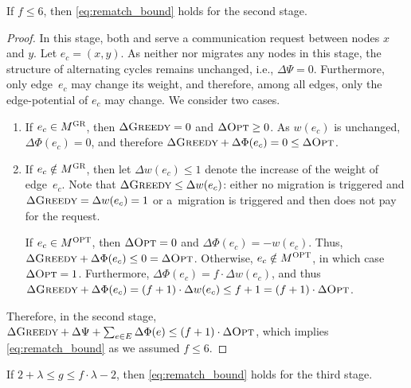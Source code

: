 \begin{lemma}
\label{lem:rematch_req}
If $f \leq 6$, then \eqref{eq:rematch_bound} holds for the second stage.
\end{lemma}

\begin{proof}
In this stage, both \GREEDY and \OPT serve a communication request between
nodes $x$ and $y$. Let $e_c = (x,y)$. As neither \GREEDY nor \OPT migrates any
nodes in this stage, the structure of alternating cycles remains
unchanged, i.e., $\Delta \Psi = 0$. Furthermore, only edge~$e_c$ may change its
weight, and therefore, among all edges, only the edge-potential of $e_c$ may
change. We consider two cases.
\begin{enumerate}

\item If $e_c \in M^\textsc{GR}$, then $\Delta \textsc{Greedy} = 0$ and $\Delta \textsc{Opt} \geq 0$. As
$w(e_c)$ is unchanged, $\Delta \Phi(e_c) = 0$, and therefore 
$\Delta \textsc{Greedy} + \Delta \Phi(e_c) = 0 \leq \Delta \textsc{Opt}$. 

\item If $e_c \notin M^\textsc{GR}$, then let $\Delta w(e_c) \leq 1$ denote the increase 
of the weight of edge~$e_c$. Note that $\Delta \textsc{Greedy} \leq \Delta w(e_c)$: 
either no migration is triggered and $\Delta \textsc{Greedy} = \Delta w(e_c) = 1$
or a~migration is triggered and then \GREEDY does not pay for the request.

If $e_c \in M^\textsc{OPT}$, then $\Delta \textsc{Opt} = 0$ and $\Delta \Phi(e_c) = -w(e_c)$.
Thus, $\Delta \textsc{Greedy} + \Delta \Phi(e_c) \leq 0 = \Delta \textsc{Opt}$. Otherwise, 
$e_c \notin M^\textsc{OPT}$, in which case 
$\Delta \textsc{Opt} = 1$. Furthermore, $\Delta \Phi(e_c) = f \cdot \Delta w(e_c)$,
and thus $\Delta \textsc{Greedy} + \Delta \Phi(e_c) = (f+1) \cdot \Delta w(e_c) \leq f+1 =
(f+1) \cdot \Delta \textsc{Opt}$.
\end{enumerate}

Therefore, in the second stage, $\Delta \textsc{Greedy} + \Delta \Psi + \sum_{e \in E}
\Delta \Phi(e) \leq (f+1) \cdot \Delta \textsc{Opt}$,
which implies \eqref{eq:rematch_bound} as we assumed $f \leq 6$.
\end{proof}


\begin{lemma}
\label{lem:greedy_swap}
If $2 + \lambda \leq g \leq f \cdot \lambda - 2$, 
then  \eqref{eq:rematch_bound} holds for the third stage.
\end{lemma}



